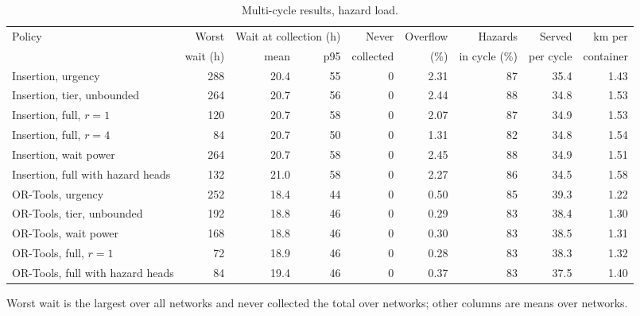 \begin{table}[!htbp]
\caption{Multi-cycle results, hazard load.}
\label{tab:rollout_hazard}
\centering
\footnotesize
\setlength{\tabcolsep}{3pt}
\begin{tabular}{lrrrrrrrr}
\toprule
Policy & Worst & \multicolumn{2}{c}{Wait at collection (h)} & Never & Overflow & Hazards & Served & km per \\
\cmidrule(lr){3-4}
 & wait (h) & mean & p95 & collected & (\%) & in cycle (\%) & per cycle & container \\
\midrule
Insertion, urgency & 288 & 20.4 & 55 & 0 & 2.31 & 87 & 35.4 & 1.43 \\
Insertion, tier, unbounded & 264 & 20.7 & 56 & 0 & 2.44 & 88 & 34.8 & 1.53 \\
Insertion, full, $r = 1$ & 120 & 20.7 & 58 & 0 & 2.07 & 87 & 34.9 & 1.53 \\
Insertion, full, $r = 4$ & 84 & 20.7 & 50 & 0 & 1.31 & 82 & 34.8 & 1.54 \\
Insertion, wait power & 264 & 20.7 & 58 & 0 & 2.45 & 88 & 34.9 & 1.51 \\
Insertion, full with hazard heads & 132 & 21.0 & 58 & 0 & 2.27 & 86 & 34.5 & 1.58 \\
OR-Tools, urgency & 252 & 18.4 & 44 & 0 & 0.50 & 85 & 39.3 & 1.22 \\
OR-Tools, tier, unbounded & 192 & 18.8 & 46 & 0 & 0.29 & 83 & 38.4 & 1.30 \\
OR-Tools, wait power & 168 & 18.8 & 46 & 0 & 0.30 & 83 & 38.5 & 1.31 \\
OR-Tools, full, $r = 1$ & 72 & 18.9 & 46 & 0 & 0.28 & 83 & 38.3 & 1.32 \\
OR-Tools, full with hazard heads & 84 & 19.4 & 46 & 0 & 0.37 & 83 & 37.5 & 1.40 \\
\bottomrule
\end{tabular}
\par\smallskip\footnotesize Worst wait is the largest over all networks and never collected the total over networks; other columns are means over networks.
\end{table}
